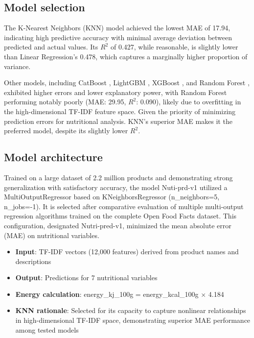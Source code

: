 \newpage
\subsection{Model selection}
 The K-Nearest Neighbors (KNN) model achieved the lowest MAE of 17.94, indicating high predictive accuracy with minimal average deviation between predicted and actual values. Its \(R^2\) of 0.427, while reasonable, is slightly lower than Linear Regression’s 0.478, which captures a marginally higher proportion of variance. 
 \par Other models, including CatBoost , LightGBM , XGBoost , and Random Forest , exhibited higher errors and lower explanatory power, with Random Forest performing notably poorly (MAE: 29.95, \(R^2\): 0.090), likely due to overfitting in the high-dimensional TF-IDF feature space. Given the priority of minimizing prediction errors for nutritional analysis. KNN’s superior MAE makes it the preferred model, despite its slightly lower \(R^2\). 

\subsection{Model architecture}
Trained on a large dataset of 2.2 million products and demonstrating strong generalization with satisfactory accuracy, the model Nuti-prd-v1 utilized a MultiOutputRegressor based on KNeighborsRegressor (n\_neighbors=5, n\_jobs=-1). It is selected after comparative evaluation of multiple multi-output regression algorithms trained on the complete Open Food Facts dataset. This configuration, designated Nutri-pred-v1, minimized the mean absolute error (MAE) on nutritional variables.

\begin{itemize}
    \item \textbf{Input}: TF-IDF vectors (12,000 features) derived from product names and descriptions
    \item \textbf{Output}: Predictions for 7 nutritional variables
    \item \textbf{Energy calculation}: energy\_kj\_100g = energy\_kcal\_100g × 4.184
    \item \textbf{KNN rationale}: Selected for its capacity to capture nonlinear relationships in high-dimensional TF-IDF space, demonstrating superior MAE performance among tested models
\end{itemize}


